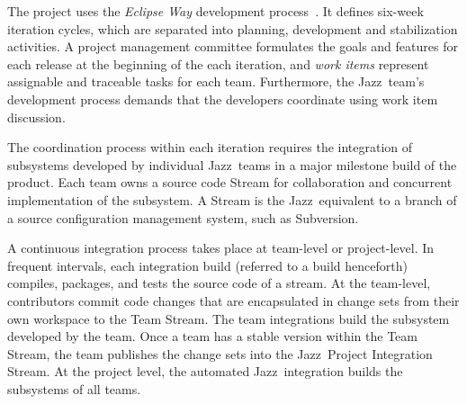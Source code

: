 The project uses the \emph{Eclipse Way} development process~\cite{frost:ieeesoftware:2007}.
It defines six-week iteration cycles, which are separated into planning,
development and stabilization activities. A project management committee
formulates the goals and features for each release at the beginning of the each
iteration, and \emph{work items} represent assignable and traceable tasks for each
team.
Furthermore, the Jazz\texttrademark\ team's development process demands that the developers coordinate using work item discussion. 

The coordination process within
each iteration requires the integration of subsystems developed by individual
Jazz\tm\ teams in a major milestone build of the product.
Each team owns a source code Stream for collaboration and concurrent
implementation of the subsystem. A Stream is the Jazz\tm\ equivalent to a branch of a
source configuration management system, such as Subversion.

A continuous integration process takes place at team-level or project-level. In
frequent intervals, each integration build (referred to a build henceforth)
compiles, packages, and tests the source code of a stream. At the team-level,
contributors commit code changes that are encapsulated in change sets from
their own workspace to the Team Stream. The team integrations build the
subsystem developed by the team. Once a team has a stable version within the Team
Stream, the team publishes the change sets into the Jazz\tm\ Project Integration
Stream. At the project level, the automated
Jazz\tm\ integration builds the subsystems of all teams. 




